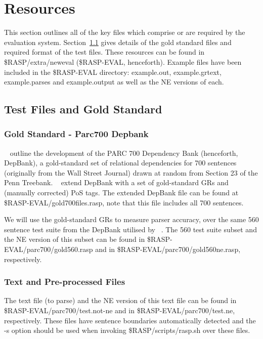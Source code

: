 \documentclass[10pt]{article}
\begin{document}
\section{Resources}
\label{resources}

This section outlines all of the key files which
comprise or are required by the evaluation system.
Section~\ref{gold} gives details of the gold standard files
and required format of the test files.
These resources can be found in \$RASP/extra/neweval 
(\$RASP-EVAL, henceforth).
Example files have been included in the \$RASP-EVAL
directory: example.out, example.grtext, example.parses
and example.output as well as the NE versions of each.

\subsection{Test Files and Gold Standard}
\label{gold}

\subsubsection{Gold Standard - Parc700 Depbank}

~\citeyear{king03} outline the development of the PARC 700 Dependency
Bank (henceforth, DepBank), a gold-standard set of relational
dependencies for 700 sentences (originally from the Wall Street 
Journal) drawn at random from Section 23 of the Penn Treebank. 
~\citeyear{briscoe05} extend DepBank with a set of
gold-standard GRs and (manually corrected) PoS tags.
The extended DepBank file can be found at
\$RASP-EVAL/gold700files.rasp, note that this file includes
all 700 sentences.

We will use the gold-standard GRs to measure parser accuracy,
over the same 560 sentence test suite from the DepBank 
utilised by ~\citeyear{kaplan04}.
The 560 test suite subset and the NE version of this subset 
can be found in
\$RASP-EVAL/parc700/gold560.rasp and in 
\$RASP-EVAL/parc700/gold560ne.rasp, respectively.

\subsubsection{Text and Pre-processed Files}

The text file (to parse) and the NE version of this text file 
can be found in \$RASP-EVAL/parc700/test.not-ne and in 
\$RASP-EVAL/parc700/test.ne, respectively.
These files have sentence boundaries automatically detected
and the -s option should be used when invoking \$RASP/scripts/rasp.sh
over these files.
\end{document}
